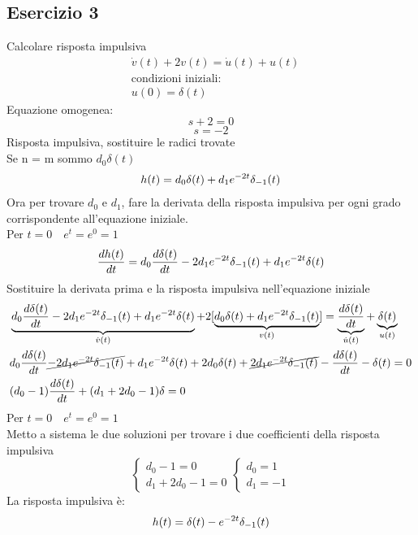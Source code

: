 	\subsection{Esercizio 3}
	Calcolare risposta impulsiva
		\[
		\begin{split}
		&\dot{v}(t)+2v(t) = \dot{u}(t)+u(t)\\
		&\mathrm{condizioni \,\, iniziali:}\\
		&u(0)=\delta(t)
		\end{split}
		\]
		Equazione omogenea:
		\[s + 2 = 0\]
		\[s = -2\]
		Risposta impulsiva, sostituire le radici trovate\\
		Se n = m sommo $d_0 \delta(t)$
		\[
		\begin{split}
		h(t) = d_0 \delta(t) + d_1e^{-2t}\delta_{-1}(t)
		\end{split}
		\]
		Ora per trovare $d_0$ e $d_1$, fare la derivata della risposta impulsiva per ogni grado corrispondente all'equazione iniziale.\\
		Per $t=0 \quad e^t = e^0 = 1$
		\[
		\frac{dh(t)}{dt} = d_0\frac{d\delta(t)}{dt}-2d_1e^{-2t}\delta_{-1}(t)+d_1e^{-2t}\delta(t)
		\]
		Sostituire la derivata prima e la risposta impulsiva nell'equazione iniziale
		\[
		\begin{split}
		&\underbrace{d_0\frac{d\delta(t)}{dt}-2d_1e^{-2t}\delta_{-1}(t)+d_1e^{-2t}\delta(t)}_{\dot{v}(t)} + 
		2[\underbrace{d_0 \delta(t) + d_1e^{-2t}\delta_{-1}(t)}_{v(t)}] = \underbrace{\frac{d\delta(t)}{dt}}_{\dot{u}(t)} + \underbrace{\delta(t)}_{u(t)}\\
		&d_0\frac{d\delta(t)}{dt}\cancel{-2d_1e^{-2t}\delta_{-1}(t)}+d_1e^{-2t}\delta(t)+2d_0 \delta(t) + \cancel{2d_1e^{-2t}\delta_{-1}(t)} -\frac{d\delta(t)}{dt} - \delta(t) = 0\\
		&(d_0 - 1)\frac{d\delta(t)}{dt} + (d_1 + 2d_0 -1)\delta = 0
		\end{split}
		\]
		Per $t=0 \quad e^t = e^0 = 1$\\
		Metto a sistema le due soluzioni per trovare i due coefficienti della risposta impulsiva
		\[
		\begin{cases}
		d_0 -1 = 0\\
		d_1 + 2d_0 -1 = 0
		\end{cases}
		\begin{cases}
		d_0 = 1\\
		d_1 = -1
		\end{cases}
		\]
		La risposta impulsiva è:\\
		\[h(t) = \delta(t) - e^{-2t} \delta_{-1}(t)\]
		\newpage
